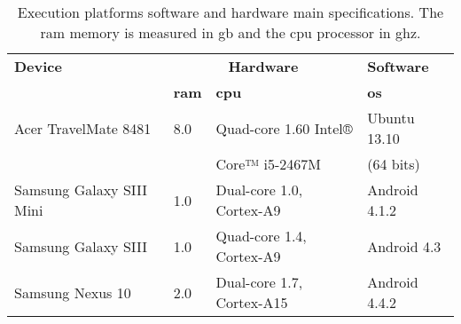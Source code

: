 \begin{table}
 \caption{Execution platforms software and hardware main specifications. The \ac{ram}
 memory is measured in \ac{gb} and the \ac{cpu} processor in \ac{ghz}.}
 \label{tbl:devices_specs}
 \footnotesize
 \centering
\begin{tabular}{l l l l}
  \hline 
 \textbf{Device} 		& \multicolumn{2}{c}{\textbf{Hardware}} 	
& \textbf{Software}	\\
				& \textbf{\ac{ram}} & \textbf{\ac{cpu}} 			
& \textbf{\ac{os}} 		\\
    \hline 
  Acer TravelMate 8481  	& 8.0	& Quad-core 1.60 Intel® 	 	
& Ubuntu 13.10 		\\
				& 	& Core™ i5-2467M			
& (64 bits)		\\
  Samsung Galaxy SIII Mini	& 1.0 	& Dual-core 1.0, Cortex-A9	 	
& Android 4.1.2 	\\
  Samsung Galaxy SIII 		& 1.0 	& Quad-core 1.4, Cortex-A9 		
& Android 4.3   	\\
  Samsung Nexus 10 		& 2.0 	& Dual-core 1.7, Cortex-A15 		
& Android 4.4.2 	\\
\hline
\end{tabular}
\end{table}